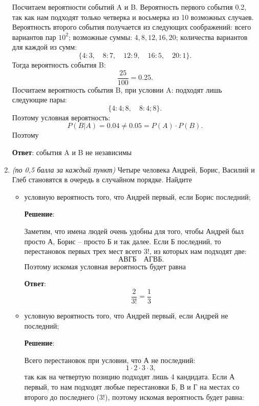 \documentclass{article}
\begin{document}
\begin{enumerate}
    Посчитаем вероятности событий A и B. Вероятность первого события 0.2, так как нам подходят только четверка и восьмерка из 10 возможных случаев. Вероятность второго события получается из следующих соображений: всего вариантов пар $10^2$; возможные суммы: $4,8,12,16,20$; количества вариантов для каждой из сумм:
    \begin{equation}
        \{4:3,\quad8:7,\quad12:9,\quad16:5,\quad20:1\}.
    \end{equation}
    Тогда вероятность события B:
    \begin{equation}
        \frac{25}{100} = 0.25.
    \end{equation}
    Посчитаем вероятность события B, при условии A: подходят лишь следующие пары:
    \begin{equation}
        \{4:4;8,\quad 8:4;8\}.
    \end{equation}
    Поэтому условная вероятность:
    \begin{equation}
        P(B|A) = 0.04 \ne 0.05 = P(A)\cdot P(B).
    \end{equation}
    Поэтому

    \textbf{Ответ}:
    события A и B не независимы

    \item \textit{(по 0,5 балла за каждый пункт)} Четыре человека Андрей, Борис, Василий и Глеб
    становятся в очередь в случайном порядке. Найдите
    \begin{itemize}
        \item условную вероятность того, что Андрей первый, если Борис последний;
        
        \textbf{Решение}:

        Заметим, что имена людей очень удобны для того, чтобы Андрей был просто А, Борис -- просто Б и так далее. Если Б последний, то перестановок первых трех мест всего $3!$, из которых нам подходят две:
        \begin{equation}
            \text{АВГБ} \quad \text{АГВБ}.
        \end{equation}
        Поэтому искомая условная вероятность будет равна

        \textbf{Ответ}:
        $$\dfrac{2}{3!} = \dfrac{1}{3}$$

        \item условную вероятность того, что Андрей первый, если Андрей не последний;
                
        \textbf{Решение}:

        Всего перестановок при условии, что А не последний:
        \begin{equation}
            1\cdot 2\cdot 3\cdot 3,
        \end{equation}
        так как на четвертую позицию подходят лишь 4 кандидата. Если А первый, то нам подходят любые перестановки Б, В и Г на местах со второго до последнего ($3!$), поэтому искомая вероятность будет равна:


\end{itemize}
\end{enumerate}
\end{document}
